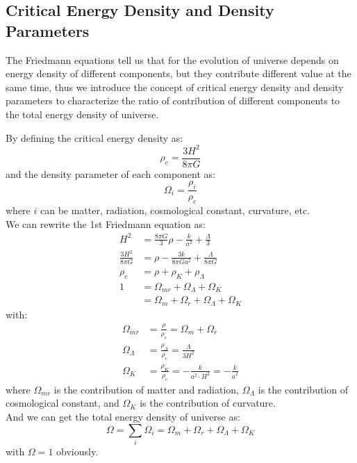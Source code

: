 \subsection{Critical Energy Density and Density Parameters}
\begin{intuition}
    The Friedmann equations tell us that for the evolution of universe depends on energy density of different components, but they contribute different value at the same time, thus we introduce the concept of critical energy density and density parameters to characterize the ratio of contribution of different components to the total energy density of universe. \\
\end{intuition}

\bigskip \noindent
\begin{theory}
    By defining the critical energy density as:
    \[
        \rho_c = \frac{3H^2}{8\pi G}
    \]
    and the density parameter of each component as:
    \[
        \Omega_i = \frac{\rho_i}{\rho_c}
    \]
    where $i$ can be matter, radiation, cosmological constant, curvature, etc. \\

    We can rewrite the 1st Friedmann equation as:
    \begin{align*}
        H^2 &= \frac{8\pi G}{3}\rho - \frac{k}{a^2} + \frac{\Lambda}{3} \\
        \frac{3H^2}{8\pi G} &= \rho - \frac{3k}{8\pi G a^2} + \frac{\Lambda}{8\pi G} \\
        \rho_c &= \rho + \rho_K + \rho_\Lambda \\
        1 &= \Omega_{mr} + \Omega_\Lambda + \Omega_K \\
         &= \Omega_{m} + \Omega_{r} + \Omega_\Lambda + \Omega_K
    \end{align*}
    with:
    \begin{align*}
         \Omega_{mr} &= \frac{\rho}{\rho_c} = \Omega_{m} + \Omega_{r} \\
         \Omega_\Lambda &= \frac{\rho_\Lambda}{\rho_c} = \frac{\Lambda}{3H^2} \\
         \Omega_K &= \frac{\rho_K}{\rho_c} = -\frac{k}{a^2 \cdot H^2} = -\frac{k}{\dot{a}^2}
    \end{align*}
     where $\Omega_{mr}$ is the contribution of matter and radiation, $\Omega_\Lambda$ is the contribution of cosmological constant, and $\Omega_K$ is the contribution of curvature. \\

    And we can get the total energy density of universe as:
    \[
        \Omega = \sum_i \Omega_i = \Omega_{m} + \Omega_{r} + \Omega_\Lambda + \Omega_K
    \]
    with $\Omega = 1$ obviously.
\end{theory}

